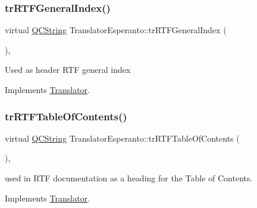 \mbox{\label{class_translator_esperanto_aa601ba0856f4fbdead70ed2b8bcdc132}} 
\subsubsection{\texorpdfstring{trRTFGeneralIndex()}{trRTFGeneralIndex()}}
{\footnotesize\ttfamily virtual \mbox{\hyperlink{class_q_c_string}{Q\+C\+String}} Translator\+Esperanto\+::tr\+R\+T\+F\+General\+Index (\begin{DoxyParamCaption}{ }\end{DoxyParamCaption})\hspace{0.3cm}{\ttfamily [inline]}, {\ttfamily [virtual]}}

Used as header R\+TF general index 

Implements \mbox{\hyperlink{class_translator}{Translator}}.

\mbox{\label{class_translator_esperanto_ab7cde3f01f068b2404b8163d1491f953}} 
\subsubsection{\texorpdfstring{trRTFTableOfContents()}{trRTFTableOfContents()}}
{\footnotesize\ttfamily virtual \mbox{\hyperlink{class_q_c_string}{Q\+C\+String}} Translator\+Esperanto\+::tr\+R\+T\+F\+Table\+Of\+Contents (\begin{DoxyParamCaption}{ }\end{DoxyParamCaption})\hspace{0.3cm}{\ttfamily [inline]}, {\ttfamily [virtual]}}

used in R\+TF documentation as a heading for the Table of Contents. 

Implements \mbox{\hyperlink{class_translator}{Translator}}.

\mbox{\label{class_translator_esperanto_a7389902c0ecda3c83b255eb3dc2b6ad3}} 
